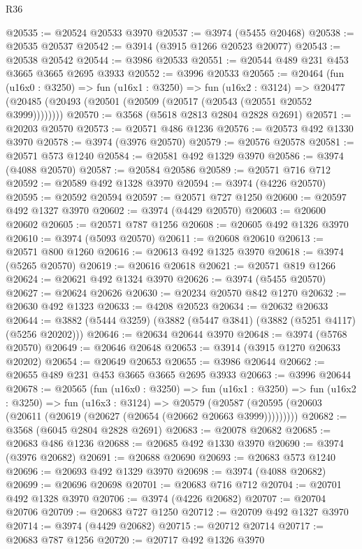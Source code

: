 \begin{lexlean}{R36}
\begin{coremodule}
@20535 := @20524 @20533 @3970
@20537 := @3974 (@5455 @20468)
@20538 := @20535 @20537
@20542 := @3914 (@3915 @1266 @20523 @20077)
@20543 := @20538 @20542
@20544 := @3986 @20533
@20551 := @20544 @489 @231 @453 @3665 @3665 @2695 @3933
@20552 := @3996 @20533
@20565 := @20464
    (fun (u16x0 : @3250) =>
    fun (u16x1 : @3250) =>
    fun (u16x2 : @3124) =>
    @20477 (@20485 (@20493 (@20501 (@20509 (@20517 (@20543 (@20551 @20552 @3999))))))))
@20570 := @3568 (@5618 @2813 @2804 @2828 @2691)
@20571 := @20203 @20570
@20573 := @20571 @486 @1236
@20576 := @20573 @492 @1330 @3970
@20578 := @3974 (@3976 @20570)
@20579 := @20576 @20578
@20581 := @20571 @573 @1240
@20584 := @20581 @492 @1329 @3970
@20586 := @3974 (@4088 @20570)
@20587 := @20584 @20586
@20589 := @20571 @716 @712
@20592 := @20589 @492 @1328 @3970
@20594 := @3974 (@4226 @20570)
@20595 := @20592 @20594
@20597 := @20571 @727 @1250
@20600 := @20597 @492 @1327 @3970
@20602 := @3974 (@4429 @20570)
@20603 := @20600 @20602
@20605 := @20571 @787 @1256
@20608 := @20605 @492 @1326 @3970
@20610 := @3974 (@5093 @20570)
@20611 := @20608 @20610
@20613 := @20571 @800 @1260
@20616 := @20613 @492 @1325 @3970
@20618 := @3974 (@5265 @20570)
@20619 := @20616 @20618
@20621 := @20571 @819 @1266
@20624 := @20621 @492 @1324 @3970
@20626 := @3974 (@5455 @20570)
@20627 := @20624 @20626
@20630 := @20234 @20570 @842 @1270
@20632 := @20630 @492 @1323
@20633 := @4208 @20523
@20634 := @20632 @20633
@20644 := @3882 (@5444 @3259) (@3882 (@5447 @3841) (@3882 (@5251 @4117) (@5256 @20202)))
@20646 := @20634 @20644 @3970
@20648 := @3974 (@5768 @20570)
@20649 := @20646 @20648
@20653 := @3914 (@3915 @1270 @20633 @20202)
@20654 := @20649 @20653
@20655 := @3986 @20644
@20662 := @20655 @489 @231 @453 @3665 @3665 @2695 @3933
@20663 := @3996 @20644
@20678 := @20565
    (fun (u16x0 : @3250) =>
    fun (u16x1 : @3250) =>
    fun (u16x2 : @3250) =>
    fun (u16x3 : @3124) =>
    @20579 (@20587 (@20595 (@20603 (@20611 (@20619 (@20627 (@20654 (@20662 @20663 @3999)))))))))
@20682 := @3568 (@6045 @2804 @2828 @2691)
@20683 := @20078 @20682
@20685 := @20683 @486 @1236
@20688 := @20685 @492 @1330 @3970
@20690 := @3974 (@3976 @20682)
@20691 := @20688 @20690
@20693 := @20683 @573 @1240
@20696 := @20693 @492 @1329 @3970
@20698 := @3974 (@4088 @20682)
@20699 := @20696 @20698
@20701 := @20683 @716 @712
@20704 := @20701 @492 @1328 @3970
@20706 := @3974 (@4226 @20682)
@20707 := @20704 @20706
@20709 := @20683 @727 @1250
@20712 := @20709 @492 @1327 @3970
@20714 := @3974 (@4429 @20682)
@20715 := @20712 @20714
@20717 := @20683 @787 @1256
@20720 := @20717 @492 @1326 @3970

\end{coremodule}
\end{lexlean}
